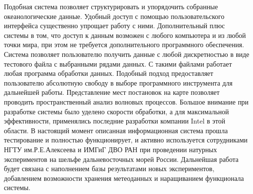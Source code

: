 Подобная система позволяет структурировать и упорядочить собранные океанологические данные. Удобный доступ с помощью пользовательского интерфейса существенно упрощает работу с ними. Дополнительный плюс системы в том, что доступ к данным возможен с любого компьютера и из любой точки мира, при этом не требуется дополнительного программного обеспечения. Система позволяет пользователю получить данные с любой дискретностью в виде тестового файла с выбранными рядами данных. С такими файлами работает любая программа обработки данных. Подобный подход предоставляет пользователю абсолютную свободу в выборе программного инструмента для дальнейшей работы. Представление мест постановок на карте позволяет проводить пространственный анализ волновых процессов. Большое внимание при разработке системы было уделено скорости обработки, а для максимальной эффективности, применялись последние разработки компании Intel в этой области.
В настоящий момент описанная информационная система прошла тестирование и полностью функционирует, и активно используется сотрудниками НГТУ им.Р.Е.Алексеева и ИМГиГ ДВО РАН при проведении натурных экспериментов на шельфе дальневосточных морей России. Дальнейшая работа будет связана с наполнением базы результатами новых экспериментов, добавлением возможности хранения метеоданных и наращиванием функционала системы.

\clearpage
